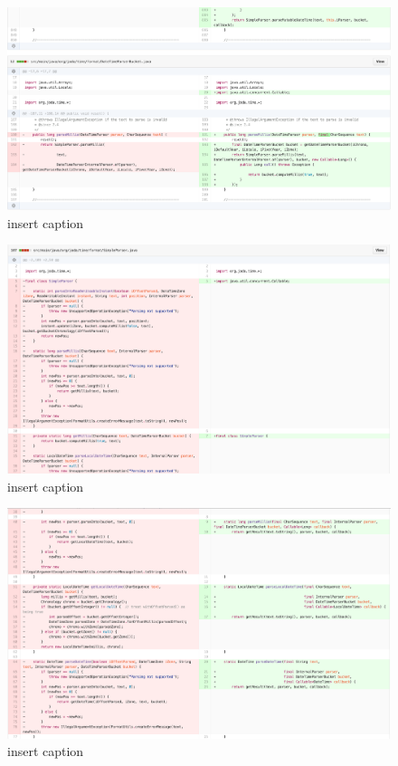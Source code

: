 \begin{figure}[H]
	\centering
	\includegraphics[width=\linewidth]{code91}
	\caption{insert caption}
\end{figure}
\begin{figure}[H]
	\centering
	\includegraphics[width=\linewidth]{code92}
	\caption{insert caption}
\end{figure}
\begin{figure}[H]
	\centering
	\includegraphics[width=\linewidth]{code93}
	\caption{insert caption}
\end{figure}
